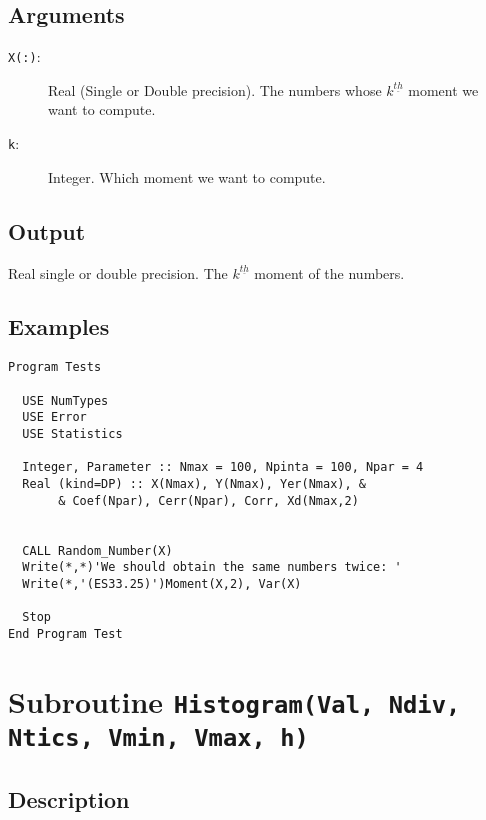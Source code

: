 \subsection{Arguments}

\begin{description}
\item[\texttt{X(:)}:] Real (Single or Double precision). The numbers
  whose $k^{\underline{th}}$ moment we want to compute.
\item[\texttt{k}:] Integer. Which moment we want to compute.
\end{description}

\subsection{Output}

Real single or double precision. The $k^{\underline{th}}$ moment of
the numbers.

\subsection{Examples}

\begin{lstlisting}[emph=Moment,
                   emphstyle=\color{blue},
                   frame=trBL,
                   caption=Computing the k$^{\text{\underline{th}}}$
                   moment of a data set.,
                   label=moment]
Program Tests

  USE NumTypes
  USE Error
  USE Statistics

  Integer, Parameter :: Nmax = 100, Npinta = 100, Npar = 4
  Real (kind=DP) :: X(Nmax), Y(Nmax), Yer(Nmax), &
       & Coef(Npar), Cerr(Npar), Corr, Xd(Nmax,2)


  CALL Random_Number(X)
  Write(*,*)'We should obtain the same numbers twice: '
  Write(*,'(ES33.25)')Moment(X,2), Var(X)

  Stop
End Program Test
\end{lstlisting}

\section{Subroutine \texttt{Histogram(Val, Ndiv, Ntics, Vmin, Vmax,
    h)}} 

\subsection{Description}


